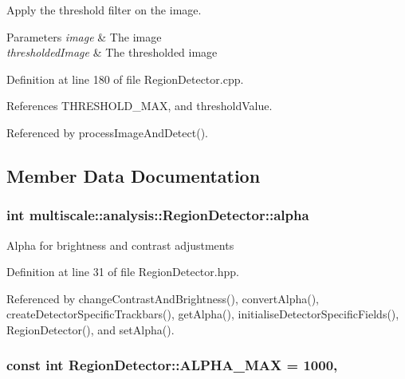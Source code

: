 Apply the threshold filter on the image. 


\begin{DoxyParams}{Parameters}
{\em image} & The image \\
\hline
{\em thresholded\-Image} & The thresholded image \\
\hline
\end{DoxyParams}


Definition at line 180 of file Region\-Detector.\-cpp.



References T\-H\-R\-E\-S\-H\-O\-L\-D\-\_\-\-M\-A\-X, and threshold\-Value.



Referenced by process\-Image\-And\-Detect().



\subsection{Member Data Documentation}
\hypertarget{classmultiscale_1_1analysis_1_1RegionDetector_ab768a3bbfff9835b441a889ab2cb05a6}{
\subsubsection[{alpha}]{\setlength{\rightskip}{0pt plus 5cm}int multiscale\-::analysis\-::\-Region\-Detector\-::alpha\hspace{0.3cm}{\ttfamily [private]}}}\label{classmultiscale_1_1analysis_1_1RegionDetector_ab768a3bbfff9835b441a889ab2cb05a6}
Alpha for brightness and contrast adjustments 

Definition at line 31 of file Region\-Detector.\-hpp.



Referenced by change\-Contrast\-And\-Brightness(), convert\-Alpha(), create\-Detector\-Specific\-Trackbars(), get\-Alpha(), initialise\-Detector\-Specific\-Fields(), Region\-Detector(), and set\-Alpha().

\hypertarget{classmultiscale_1_1analysis_1_1RegionDetector_a7ca1e136dc9d768f1e11cd6f770d950f}{
\subsubsection[{A\-L\-P\-H\-A\-\_\-\-M\-A\-X}]{\setlength{\rightskip}{0pt plus 5cm}const int Region\-Detector\-::\-A\-L\-P\-H\-A\-\_\-\-M\-A\-X = 1000\hspace{0.3cm}{\ttfamily [static]}, {\ttfamily [private]}}}\label{classmultiscale_1_1analysis_1_1RegionDetector_a7ca1e136dc9d768f1e11cd6f770d950f}


